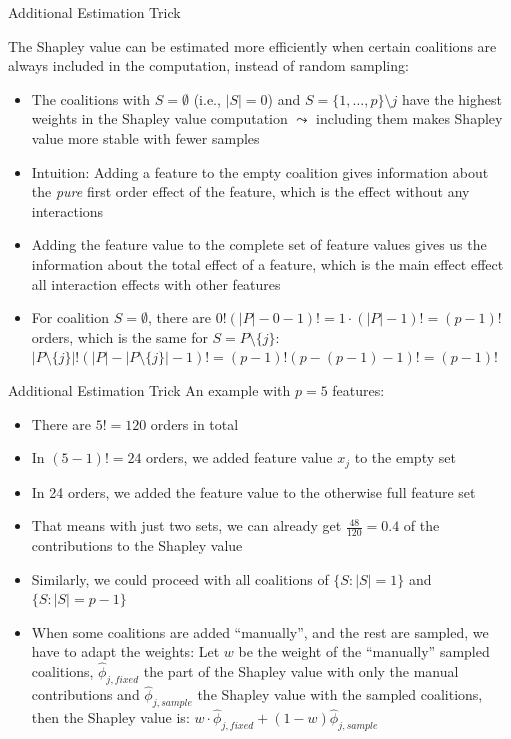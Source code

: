 \documentclass[11pt,compress,t,notes=noshow, aspectratio=169, xcolor=table]{beamer}
\begin{document}
\begin{vbframe}{Additional Estimation Trick}


  The Shapley value can be estimated more efficiently when certain coalitions are always included in the computation, instead of random sampling:
  \vspace{0.25cm}
  \begin{itemize}
  \itemsep1em
    \item The coalitions with $S = \emptyset$ (i.e., $|S| = 0$) and $S = \{1, \ldots, p\} \setminus j$ have the highest weights in the Shapley value computation $\leadsto$ including them makes Shapley value more stable with fewer samples %
    \item Intuition: Adding a feature to the empty coalition gives information about the \textit{pure} first order effect of the feature, which is the effect without any interactions \item Adding the feature value to the complete set of feature values gives us the information about the total effect of a feature, which is the main effect effect all interaction effects with other features
    \item For coalition $S = \emptyset$, there are $0! (|P| - 0 - 1)! = 1 \cdot (|P| - 1)! = (p - 1)!$ orders, which is the same for $S = P \setminus \{j\}$: $|P \setminus \{j\}|! (|P| - |P \setminus \{j\}| - 1)! = (p - 1)! (p - (p-1) - 1)! = (p-1)!$
\end{itemize}
 \end{vbframe}

\begin{vbframe}{Additional Estimation Trick}
An example with $p = 5$ features:
\vspace{0.25cm}
    \begin{itemize}
    \itemsep1em
        \item There are $5! = 120$ orders in total
        \item In $(5 - 1)! = 24$ orders, we added feature value $x_j$ to the empty set
        \item In 24 orders, we added the feature value to the otherwise full feature set
        \item That means with just two sets, we can already get $\frac{48}{120} = 0.4$ of the contributions to the Shapley value
        \item Similarly, we could proceed with all coalitions of $\{S: |S| = 1\}$ and $\{S: |S| = p - 1\}$
        \item When some coalitions are added \enquote{manually}, and the rest are sampled, we have to adapt the weights: Let $w$ be the weight of the \enquote{manually} sampled coalitions, $\hat{\phi}_{j,fixed}$ the part of the Shapley value with only the manual contributions and $\hat{\phi}_{j,sample}$ the Shapley value with the sampled coalitions, then the Shapley value is: $w \cdot \hat{\phi}_{j,fixed} + (1 - w) \hat{\phi}_{j,sample}$
  \end{itemize}
\end{vbframe}
\end{document}
